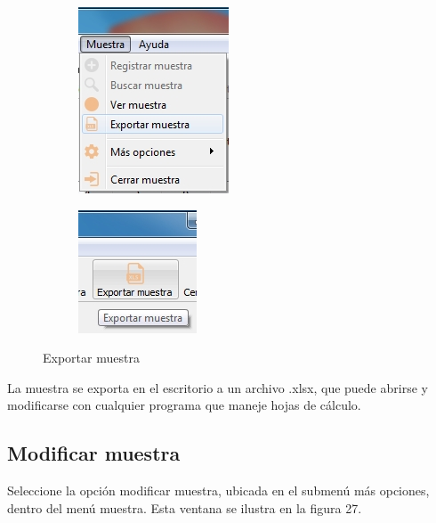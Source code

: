 \begin{figure}[H]
\centering
\begin{subfigure}{.5\textwidth}
  \centering
  \includegraphics[width=.6\linewidth]{./img/exportar-menu.jpg}
\end{subfigure}%
\begin{subfigure}{.5\textwidth}
  \centering
  \includegraphics[width=.45\linewidth]{./img/exportar-barra.jpg}
\end{subfigure}
\caption{Exportar muestra}
\end{figure}

	La muestra se exporta en el escritorio a un archivo .xlsx, que puede abrirse y modificarse con cualquier programa que maneje hojas de c\'{a}lculo.

	\subsection{Modificar muestra}
	
	Seleccione la opci\'{o}n modificar muestra, ubicada en el submen\'{u} m\'{a}s opciones, dentro del men\'{u} muestra. Esta ventana se ilustra en la figura 27.
	
